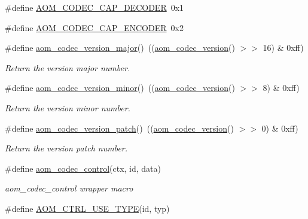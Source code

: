 \begin{DoxyCompactItemize}
\#define \hyperlink{group__codec_gad362e3d79e8520028c790659c1c77174}{A\+O\+M\+\_\+\+C\+O\+D\+E\+C\+\_\+\+C\+A\+P\+\_\+\+D\+E\+C\+O\+D\+ER}~0x1
\item 
\#define \hyperlink{group__codec_ga59ba7a82c1363e296a0a4db618d4099a}{A\+O\+M\+\_\+\+C\+O\+D\+E\+C\+\_\+\+C\+A\+P\+\_\+\+E\+N\+C\+O\+D\+ER}~0x2
\item 
\mbox{\label{group__codec_gaf35aecefb8133a5474d0068119e6182c}} 
\#define \hyperlink{group__codec_gaf35aecefb8133a5474d0068119e6182c}{aom\+\_\+codec\+\_\+version\+\_\+major}()~((\hyperlink{group__codec_gaaed56af63c70186d571ab44c72500e77}{aom\+\_\+codec\+\_\+version}() $>$$>$ 16) \& 0xff)
\begin{DoxyCompactList}\small\item\em Return the version major number. \end{DoxyCompactList}\item 
\mbox{\label{group__codec_gafc4f21abef83316131df07742b919d91}} 
\#define \hyperlink{group__codec_gafc4f21abef83316131df07742b919d91}{aom\+\_\+codec\+\_\+version\+\_\+minor}()~((\hyperlink{group__codec_gaaed56af63c70186d571ab44c72500e77}{aom\+\_\+codec\+\_\+version}() $>$$>$ 8) \& 0xff)
\begin{DoxyCompactList}\small\item\em Return the version minor number. \end{DoxyCompactList}\item 
\mbox{\label{group__codec_gaf452ede024bf9a378fa66443494070ba}} 
\#define \hyperlink{group__codec_gaf452ede024bf9a378fa66443494070ba}{aom\+\_\+codec\+\_\+version\+\_\+patch}()~((\hyperlink{group__codec_gaaed56af63c70186d571ab44c72500e77}{aom\+\_\+codec\+\_\+version}() $>$$>$ 0) \& 0xff)
\begin{DoxyCompactList}\small\item\em Return the version patch number. \end{DoxyCompactList}\item 
\#define \hyperlink{group__codec_ga6da974f4eeaba1fa74106b28d0fe6ac5}{aom\+\_\+codec\+\_\+control}(ctx,  id,  data)
\begin{DoxyCompactList}\small\item\em aom\+\_\+codec\+\_\+control wrapper macro \end{DoxyCompactList}\item 
\#define \hyperlink{group__codec_ga09132e6ec2eb0affabe3391181d15f95}{A\+O\+M\+\_\+\+C\+T\+R\+L\+\_\+\+U\+S\+E\+\_\+\+T\+Y\+PE}(id,  typ)
$$
\end{DoxyCompactItemize}
